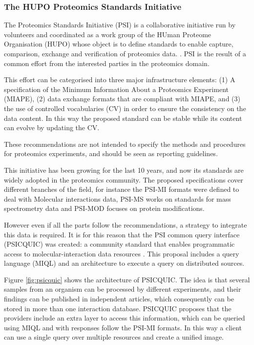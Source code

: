\subsubsection{The HUPO Proteomics Standards Initiative}
The Proteomics Standards Initiative (PSI) is a collaborative initiative run by volunteers and coordinated as a work group of the HUman Proteome Organisation (HUPO) whose object is to define standards  to enable capture, comparison, exchange and verification of proteomics data. \cite{HER2006}. PSI is the result of a common effort from the interested parties in the proteomics domain.

This effort can be categorised into three major infrastructure elements: (1) A specification of the Minimum Information About a Proteomics Experiment (MIAPE), (2) data exchange formats that are compliant with MIAPE, and (3) the use of controlled vocabularies (CV) in order to ensure the consistency on the data content. In this way the proposed standard can be stable while its content can evolve by updating the CV.

These recommendations are not intended to specify the methods and procedures for proteomics experiments, and should be seen as reporting guidelines.

This initiative has been growing for the last 10 years, and now its standards are widely adopted in the proteomics community. The proposed specifications cover different branches of the field, for instance the PSI-MI formats were defined to deal with Molecular interactions data, PSI-MS works on standards for mass spectrometry data and PSI-MOD focuses on protein modifications.

However even if all the parts follow the recommendations, a strategy to integrate this data is required. It is for this reason that the PSI common query interface (PSICQUIC) was created: a community standard that enables programmatic access to molecular-interaction data resources \cite{ARA2011}. This proposal includes a query language (MIQL) and an architecture to execute a query on distributed sources.

Figure \ref{fig:psicquic} shows the architecture of PSICQUIC. The idea is that several samples from an organism can be processed by different experiments, and their findings can be published in independent articles, which consequently can be stored in more than one interaction database. PSICQUIC proposes that the providers include an extra layer to access this information, which can be queried using MIQL and with responses follow the PSI-MI formats. In this way a client can use a single query over multiple resources and create a unified image.


